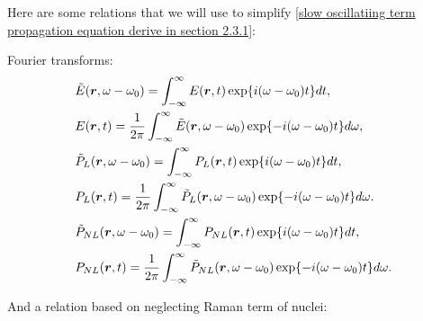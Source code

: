 \documentclass[12pt]{extarticle}
\numberwithin{equation}{section}
\numberwithin{figure}{section}
\numberwithin{table}{section}
\newcommand{\<}{\langle}
\renewcommand{\>}{\rangle}
\theoremstyle{definition}
\newcommand{\SubItem}[1]{
    {\setlength\itemindent{15pt} \item[-] #1}
}
\newcommand{\Lap}{\boldsymbol{\bigtriangledown}}
\begin{document}
\begin{itemize}
                Here are some relations that we will use to simplify \autoref{slow oscillatiing term propagation equation derive in section 2.3.1}:
                    \SubItem{
                    Fourier transforms:
                    \begin{subequations}
                    \allowdisplaybreaks
                    \begin{align}
                        &\Tilde{E}(\boldsymbol{r},\omega-\omega_0)=\int_{-\infty}^{\infty}E(\boldsymbol{r},t)\exp{i(\omega-\omega_0)t}dt, \label{fourier transform of slow oscillating term of E}\\
                        &E(\boldsymbol{r},t)=\frac{1}{2\pi}\int_{-\infty}^{\infty}\Tilde{E}(\boldsymbol{r},\omega-\omega_0)\exp{-i(\omega-\omega_0)t}d\omega, \label{inverse fourier transform of slow oscillating term of E}\\
                        &\Tilde{P}_L(\boldsymbol{r},\omega-\omega_0)=\int_{-\infty}^{\infty}P_L(\boldsymbol{r},t)\exp{i(\omega-\omega_0)t}dt, \label{fourier transform of slow oscillating term of PL}\\
                        &P_L(\boldsymbol{r},t)=\frac{1}{2\pi}\int_{-\infty}^{\infty}\Tilde{P}_L(\boldsymbol{r},\omega-\omega_0)\exp{-i(\omega-\omega_0)t}d\omega. \label{inverse fourier transform of slow oscillating term of PL}\\
                        &\Tilde{P}_{NL}(\boldsymbol{r},\omega-\omega_0)=\int_{-\infty}^{\infty}P_{NL}(\boldsymbol{r},t)\exp{i(\omega-\omega_0)t}dt, \label{fourier transform of slow oscillating term of PNL}\\
                        &P_{NL}(\boldsymbol{r},t)=\frac{1}{2\pi}\int_{-\infty}^{\infty}\Tilde{P}_{NL}(\boldsymbol{r},\omega-\omega_0)\exp{-i(\omega-\omega_0)t}d\omega. \label{inverse fourier transform of slow oscillating term of PNL}
                    \end{align}
                    \end{subequations}
                    }
                    \SubItem{
                    And a relation based on neglecting Raman term of nuclei:
}
\end{itemize}
\end{document}

